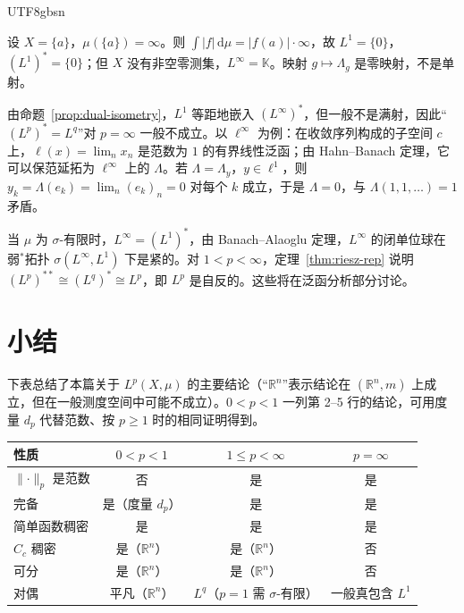 \documentclass[11pt]{article}
\newcommand{\K}{\mathbb{K}}
\newcommand{\R}{\mathbb{R}}
\newcommand{\norm}[1]{\lVert #1\rVert}
\newcommand{\dmu}{\,\mathrm{d}\mu}
\begin{document}
\begin{CJK*}{UTF8}{gbsn}
\begin{example}\label{ex:non-sigma}
设 $X=\{a\}$，$\mu(\{a\})=\infty$。则 $\int|f|\dmu=|f(a)|\cdot\infty$，故 $L^{1}=\{0\}$，$(L^{1})^{*}=\{0\}$；但 $X$ 没有非空零测集，$L^{\infty}=\K$。映射 $g\mapsto\Lambda_{g}$ 是零映射，不是单射。
\end{example}

\begin{remark}[$p=\infty$ 的情形]
由命题~\ref{prop:dual-isometry}，$L^{1}$ 等距地嵌入 $(L^{\infty})^{*}$，但一般不是满射，因此“$(L^{p})^{*}=L^{q}$”对 $p=\infty$ 一般不成立。以 $\ell^{\infty}$ 为例：在收敛序列构成的子空间 $c$ 上，$\ell(x)=\lim_{n}x_{n}$ 是范数为 $1$ 的有界线性泛函；由 Hahn--Banach 定理，它可以保范延拓为 $\ell^{\infty}$ 上的 $\Lambda$。若 $\Lambda=\Lambda_{y}$，$y\in\ell^{1}$，则 $y_{k}=\Lambda(e_{k})=\lim_{n}(e_{k})_{n}=0$ 对每个 $k$ 成立，于是 $\Lambda=0$，与 $\Lambda(1,1,\dots)=1$ 矛盾。
\end{remark}

\begin{remark}
当 $\mu$ 为 $\sigma$-有限时，$L^{\infty}=(L^{1})^{*}$，由 Banach--Alaoglu 定理，$L^{\infty}$ 的闭单位球在弱$^{*}$拓扑 $\sigma(L^{\infty},L^{1})$ 下是紧的。对 $1<p<\infty$，定理~\ref{thm:riesz-rep} 说明 $(L^{p})^{**}\cong(L^{q})^{*}\cong L^{p}$，即 $L^{p}$ 是自反的。这些将在泛函分析部分讨论。
\end{remark}

\section*{小结}

下表总结了本篇关于 $L^{p}(X,\mu)$ 的主要结论（“$\R^{n}$”表示结论在 $(\R^{n},m)$ 上成立，但在一般测度空间中可能不成立）。$0<p<1$ 一列第 2--5 行的结论，可用度量 $d_{p}$ 代替范数、按 $p\ge1$ 时的相同证明得到。

\begin{center}
\small
\begin{tabular}{@{}lccc@{}}
\toprule
性质 & $0<p<1$ & $1\le p<\infty$ & $p=\infty$\\
\midrule
$\norm{\cdot}_{p}$ 是范数 & 否 & 是 & 是\\
完备 & 是（度量 $d_{p}$） & 是 & 是\\
简单函数稠密 & 是 & 是 & 是\\
$C_{c}$ 稠密 & 是（$\R^{n}$） & 是（$\R^{n}$） & 否\\
可分 & 是（$\R^{n}$） & 是（$\R^{n}$） & 否\\
对偶 & 平凡（$\R^{n}$） & $L^{q}$（$p=1$ 需 $\sigma$-有限） & 一般真包含 $L^{1}$\\
\bottomrule
\end{tabular}
\end{center}


\end{CJK*}
\end{document}

